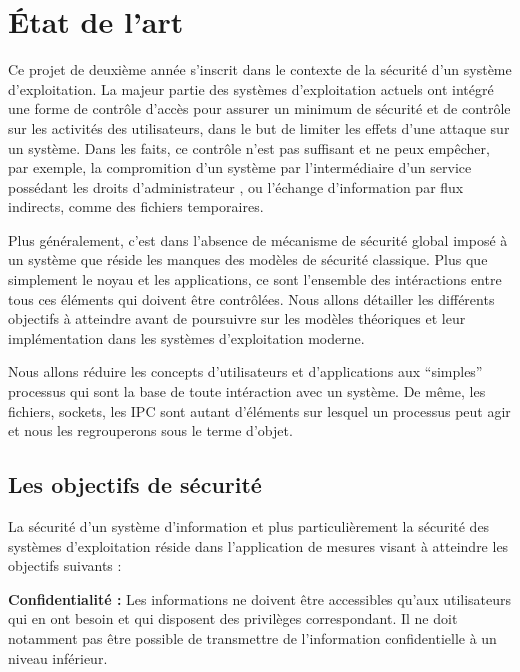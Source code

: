 \section{\'Etat de l'art}

Ce projet de deuxième année s'inscrit dans le contexte de la sécurité d'un système d'exploitation. La majeur partie des systèmes d'exploitation actuels ont intégré une forme de contrôle d'accès pour assurer un minimum de sécurité et de contrôle sur les activités des utilisateurs, dans le but de limiter les effets d'une attaque sur un système. Dans les faits, ce contrôle n'est pas suffisant et ne peux empêcher, par exemple, la compromition d'un système par l'intermédiaire d'un service possédant les droits d'administrateur \cite{TIOF}, ou l'échange d'information par flux indirects, comme des fichiers temporaires.

Plus généralement, c'est dans l'absence de mécanisme de sécurité global imposé à un système que réside les manques des modèles de sécurité classique. Plus que simplement le noyau et les applications, ce sont l'ensemble des intéractions entre tous ces éléments qui doivent être contrôlées. Nous allons détailler les différents objectifs à atteindre avant de poursuivre sur les modèles théoriques et leur implémentation dans les systèmes d'exploitation moderne.


Nous allons réduire les concepts d'utilisateurs et d'applications aux ``simples'' processus qui sont la base de toute intéraction avec un système. De même, les fichiers, sockets, les IPC sont autant d'éléments sur lesquel un processus peut agir et nous les regrouperons sous le terme d'objet.

\subsection{Les objectifs de sécurité}

La sécurité d'un système d'information et plus particulièrement la sécurité des systèmes d'exploitation réside dans l'application de mesures visant à atteindre les objectifs suivants :

\textbf{Confidentialité :}
Les informations ne doivent être accessibles qu'aux utilisateurs qui en ont besoin et qui disposent des privilèges correspondant. Il ne doit notamment pas être possible de transmettre de l'information confidentielle à un niveau inférieur.

